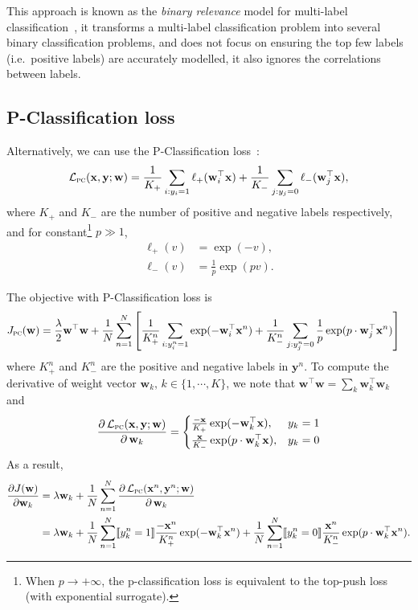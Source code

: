 \documentclass[9pt]{extarticle}
\newcommand{\llb}{\llbracket}
\newcommand{\rrb}{\rrbracket}
\newcommand{\x}{\mathbf{x}}
\newcommand{\y}{\mathbf{y}}
\newcommand{\1}{\mathbf{1}}
\newcommand{\w}{\mathbf{w}}
\newcommand{\LCal}{\mathcal{L}}
\newcommand{\ie}{i.e.\ }
\begin{document}
This approach is known as the \emph{binary relevance} model for multi-label classification~\cite{read2011classifier},
it transforms a multi-label classification problem into several binary classification problems, 
and does not focus on ensuring the top few labels (\ie positive labels) are accurately modelled,
it also ignores the correlations between labels.


\subsection{P-Classification loss}
\label{ssec:pclass}

Alternatively, we can use the P-Classification loss~\cite{ertekin2011equivalence}:
\begin{equation}
\label{eq:loss_pclass}
\LCal_\textsc{pc}(\x, \y; \w) = \frac{1}{K_+} \sum_{i:y_i=1} \ell_+(\w_i^\top \x) + \frac{1}{K_-} \sum_{j:y_j=0} \ell_-(\w_j^\top \x),
\end{equation}
where $K_+$ and $K_-$ are the number of positive and negative labels respectively,
and for constant\footnote{When $p \to +\infty$, the p-classification loss is equivalent to the top-push loss (with exponential surrogate).}
$p \gg 1$,
\begin{equation}
\begin{aligned}
\ell_+(v) & = \exp(-v), \\
\ell_-(v) & = \frac{1}{p} \exp(pv).
\end{aligned}
\end{equation}

The objective with P-Classification loss is
\begin{equation}
\label{eq:obj_pc}
\begin{aligned}
J_\textsc{pc}(\w) 
&= \frac{\lambda}{2} \w^\top \w + \frac{1}{N} \sum_{n=1}^N \left[
   \frac{1}{K_+^n} \sum_{i:y_i^n=1} \exp(-\w_i^\top \x^n) + 
   \frac{1}{K_-^n} \sum_{j:y_j^n=0} \frac{1}{p} \exp(p \cdot \w_j^\top \x^n) \right]
\end{aligned}
\end{equation}
where $K_+^n$ and $K_-^n$ are the positive and negative labels in $\y^n$.
To compute the derivative of weight vector $\w_k, \, k \in \{1,\cdots,K\}$,
we note that $\w^\top \w = \sum_k \w_k^\top \w_k$ and
$$
\frac{\partial \, \LCal_\textsc{pc}(\x, \y; \w)}{\partial \, \w_k}
= \begin{cases}
    \frac{-\x}{K_+} \exp(-\w_k^\top \x), & y_k = 1 \\
    \frac{\x }{K_-} \exp(p \cdot \w_k^\top \x), & y_k = 0
  \end{cases}
$$
As a result,
\begin{equation}
\label{eq:grad_pc}
\begin{aligned}
\frac{\partial J(\w)} {\partial \w_k} 
&= \lambda \w_k + \frac{1}{N} \sum_{n=1}^N \frac{\partial \, \LCal_\textsc{pc}(\x^n, \y^n; \w)}{\partial \, \w_k} \\
&= \lambda \w_k + 
   \frac{1}{N} \sum_{n=1}^N \llb y_k^n = 1 \rrb \frac{-\x^n}{K_+^n} \exp(-\w_k^\top \x^n) + 
   \frac{1}{N} \sum_{n=1}^N \llb y_k^n = 0 \rrb \frac{\x^n }{K_-^n} \exp(p \cdot \w_k^\top \x^n).
\end{aligned}
\end{equation}
\end{document}

